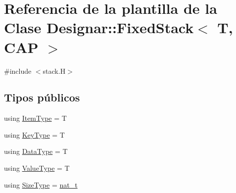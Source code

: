 \hypertarget{class_designar_1_1_fixed_stack}{}\section{Referencia de la plantilla de la Clase Designar\+:\+:Fixed\+Stack$<$ T, C\+AP $>$}
\label{class_designar_1_1_fixed_stack}


{\ttfamily \#include $<$stack.\+H$>$}

\subsection*{Tipos públicos}
\begin{DoxyCompactItemize}
\item 
using \hyperlink{class_designar_1_1_fixed_stack_a07f33a0a97fdebadd335de2f7f485942}{Item\+Type} = T
\item 
using \hyperlink{class_designar_1_1_fixed_stack_a9969f7d11746d55fe367a229bb75fa8f}{Key\+Type} = T
\item 
using \hyperlink{class_designar_1_1_fixed_stack_a4f0d06b958131d97f8084e7961d51577}{Data\+Type} = T
\item 
using \hyperlink{class_designar_1_1_fixed_stack_ad69de4dde252c1a48054ce62fbf05e95}{Value\+Type} = T
\item 
using \hyperlink{class_designar_1_1_fixed_stack_ae82564eb2309ec7a1bfd0c5bfbefc581}{Size\+Type} = \hyperlink{namespace_designar_aa72662848b9f4815e7bf31a7cf3e33d1}{nat\+\_\+t}
\end{DoxyCompactItemize}
